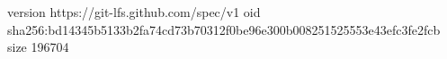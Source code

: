 version https://git-lfs.github.com/spec/v1
oid sha256:bd14345b5133b2fa74cd73b70312f0be96e300b008251525553e43efc3fe2fcb
size 196704
